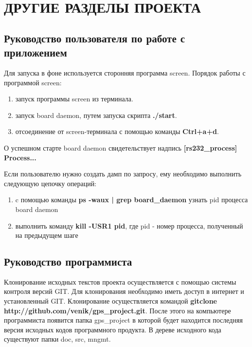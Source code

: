 \section{ДРУГИЕ РАЗДЕЛЫ ПРОЕКТА}


\subsection{Руководство пользователя по работе с приложением}

Для запуска в фоне используется сторонняя программа screen. Порядок работы с программой screen:

\begin{enumerate}
\renewcommand{\labelenumi}{\arabic{enumi}.}
\item запуск программы screen из терминала.
\item запуск board daemon, путем запуска скрипта \textbf{./start}.
\item отсоединение от screen-терминала с помощью команды \textbf{Ctrl+a+d}.
\end{enumerate}
О успешном старте board daemon свидетельствует надпись \textbf{[rs232\_process] Process...}

Если пользователю нужно создать дамп по запросу, ему необходимо выполнить следующую цепочку операций:
\begin{enumerate}
\renewcommand{\labelenumi}{\arabic{enumi}.}
\item c помощью команды \textbf{ps -waux | grep board\_daemon} узнать pid процесса board daemon
\item выполнить команду \textbf{kill -USR1 pid}, где pid - номер процесса, полученный на предыдущем шаге 
\end{enumerate}



\subsection{Руководство программиста}
Клонирование исходных текстов проекта осуществляется с помощью системы контроля версий GIT.  Для клонирования
необходимо иметь доступ в интернет и установленный GIT. Клонирование осуществляется командой \textbf{gitclone http://github.com/venik/gps\_project.git}.
После этого на компьютере программиста появится папка gps\_project в которой будет находится последняя версия исходных кодов программного продукта.
В дереве исходного кода существуют папки doc, src, mngmt. 


